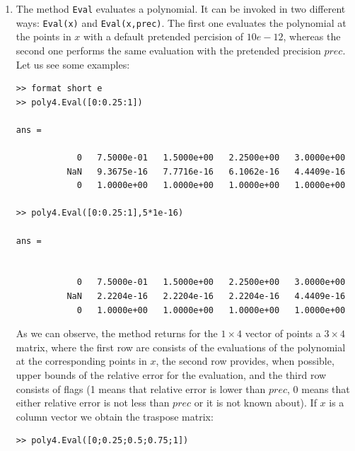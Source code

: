 \documentclass[a4paper,10pt]{report}
\begin{document}
\begin{enumerate}
\begin{verbatim}
ans = 

bin(3,0)*(1-x)^3 + 0.66667*bin(3,1)*x(1-x)^2 
 + 1.3333*bin(3,2)*x^2(1-x) + 3*bin(3,3)*x^3
>> poly2*poly4

ans = 

0.6*bin(5,1)*x(1-x)^4 + 1.8*bin(5,2)*x^2(1-x)^3 
 + 4.5*bin(5,3)*x^3(1-x)^2 + 9.6*bin(5,4)*x^4(1-x) 
 + 18*bin(5,5)*x^5
>> [q,r] = poly2/poly4

q = 

0.66667*bin(1,0)*(1-x) + 1.6667*bin(1,1)*x

r = 

1
>> poly6=poly4*q+r

poly6 = 

bin(4,0)*(1-x)^4 + 1.5*bin(4,1)*x(1-x)^3 
 + 2.5*bin(4,2)*x^2(1-x)^2 + 4*bin(4,3)*x^3(1-x) 
 + 6*bin(4,4)*x^4
>> poly6.degreeReduction()

ans = 

bin(2,0)*(1-x)^2 + 2*bin(2,1)*x*(1-x) + 6*bin(2,2)*x^2
>> poly2

poly2 = 

bin(2,0)*(1-x)^2 + 2*bin(2,1)*x*(1-x) + 6*bin(2,2)*x^2
>> poly2^2

ans = 

bin(4,0)*(1-x)^4 + 2*bin(4,1)*x(1-x)^3 
 + 4.6667*bin(4,2)*x^2(1-x)^2 + 12*bin(4,3)*x^3(1-x) 
 + 36*bin(4,4)*x^4
\end{verbatim}  
\item The method \verb"Eval" evaluates a polynomial. It can be invoked in two different ways:
  \verb"Eval(x)" and \verb"Eval(x,prec)". The first one evaluates the polynomial at the points
  in $x$ with a default pretended percision of $10e-12$, whereas the second one performs the
  same evaluation with the pretended precision $prec$. Let us see some examples:
\begin{verbatim}
>> format short e
>> poly4.Eval([0:0.25:1])

ans =

            0   7.5000e-01   1.5000e+00   2.2500e+00   3.0000e+00
          NaN   9.3675e-16   7.7716e-16   6.1062e-16   4.4409e-16
            0   1.0000e+00   1.0000e+00   1.0000e+00   1.0000e+00

>> poly4.Eval([0:0.25:1],5*1e-16)

ans =


            0   7.5000e-01   1.5000e+00   2.2500e+00   3.0000e+00
          NaN   2.2204e-16   2.2204e-16   2.2204e-16   4.4409e-16
            0   1.0000e+00   1.0000e+00   1.0000e+00   1.0000e+00
\end{verbatim}
As we can observe, the method returns for the $1\times 4$ vector of points a $3\times 4$ matrix, where the first row are
consists of the evaluations of the polynomial at the corresponding points in $x$, the second row provides, when possible,
upper bounds of the relative error for the evaluation, and the third row consists of flags (1 means that relative error is lower than $prec$, $0$
means that either relative error is not less than $prec$ or it is not known about). If $x$ is a column vector we obtain 
the traspose matrix: 
\begin{verbatim}
>> poly4.Eval([0;0.25;0.5;0.75;1])


\end{verbatim}
\end{enumerate}
\end{document}
